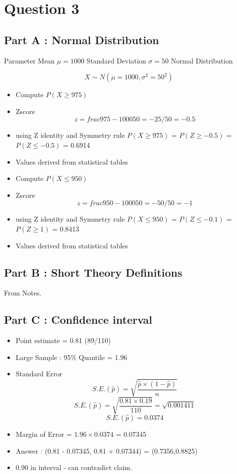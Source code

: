 \documentclass[]{article}
\begin{document}
\section*{Question 3}
\subsection*{Part A : Normal Distribution}
Parameter Mean $\mu =1000$ Standard Deviation $\sigma=50$
Normal Distribution

\[ X \sim N(\mu=1000,\sigma^2=50^2)\]

\begin{itemize}
\item Compute $P(X \geq 975)$
\item Zscore
\[ z = frac{975 - 1000}{50} = -25/50 = -0.5\]
\item using Z identity and Symmetry rule
$P(X \geq 975)$ = $P(Z \geq -0.5)$ = $P(Z \leq -0.5)$ =  0.6914
\item Values derived from statistical tables
\end{itemize}

\begin{itemize}
\item Compute $P(X \leq 950)$
\item Zscore
\[ z = frac{950 - 1000}{50} = -50/50 = -1\]
\item using Z identity and Symmetry rule
$P(X \leq 950)$ = $P(Z \leq -0.1)$ = $P(Z \geq 1)$ = 0.8413
\item Values derived from statistical tables
\end{itemize}

\subsection*{Part B : Short Theory Definitions}
From Notes.
\subsection*{Part C : Confidence interval}

\begin{itemize}
\item Point estimate = 0.81 (89/110)
\item Large Sample : 95\% Quantile = 1.96
\item Standard Error 
\[S.E.(\hat{p}) =  \sqrt{  \frac{\hat{p} \times (1-\hat{p})}{n} }\]
\[S.E.(\hat{p}) = \sqrt{\frac{0.81 \times 0.19}{110}} = \sqrt{0.001411}\]
\[S.E.(\hat{p}) = 0.0374\]
\item Margin of Error = $1.96 \times 0.0374$ = 0.07345
\item Answer : (0.81 - 0.07345, 0.81 + 0.07344) =  (0.7356,0.8825)
\item 0.90 in interval - can contradict claim.
\end{itemize}
\end{document}
